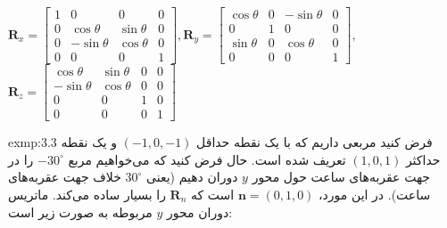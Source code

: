 {\begin{spacing}{1.5}
        \begin{center}
            $\textbf{R}_{x}=\begin{bmatrix}
                                1 & 0           & 0          & 0 \\
                                0 & \cos\theta  & \sin\theta & 0 \\
                                0 & -\sin\theta & \cos\theta & 0 \\
                                0 & 0           & 0          & 1
            \end{bmatrix}, \textbf{R}_{y}=\begin{bmatrix}
                                              \cos\theta & 0 & -\sin\theta & 0 \\
                                              0          & 1 & 0           & 0 \\
                                              \sin\theta & 0 & \cos\theta  & 0 \\
                                              0          & 0 & 0           & 1
            \end{bmatrix},$\\$\textbf{R}_{z}=\begin{bmatrix}
                                                 \cos\theta  & \sin\theta & 0 & 0 \\
                                                 -\sin\theta & \cos\theta & 0 & 0 \\
                                                 0           & 0          & 1 & 0 \\
                                                 0           & 0          & 0 & 1
            \end{bmatrix}$
        \end{center}

        \begin{exmp}{exmp:3.3}
            \Large
            فرض کنید مربعی داریم که با یک نقطه حداقل $(-1, 0, -1)$ و یک نقطه حداکثر $(1, 0, 1)$ تعریف شده است.
            حال فرض کنید که می‌خواهیم مربع $-30^\circ$ را در جهت عقربه‌های ساعت حول محور $y$ دوران دهیم (یعنی $30^\circ$ خلاف جهت عقربه‌های ساعت).
            در این مورد، $\textbf{n}=(0,1,0)$ است که $\textbf{R}_{n}$ را بسیار ساده می‌کند.
            ماتریس دوران محور $y$  مربوطه به صورت زیر است:


\end{exmp}
\end{spacing}}
